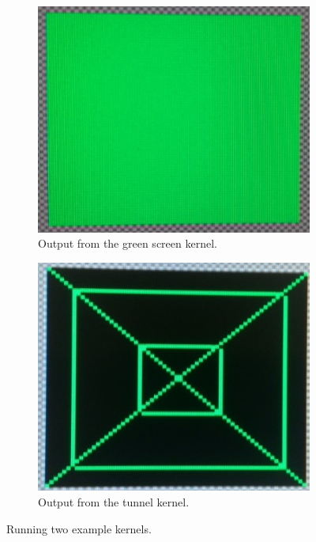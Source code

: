 \documentclass[../main/report.tex]{subfiles}
\begin{document}
\begin{figure}[H]
	\centering
	\begin{subfigure}[t]{0.45\textwidth}
		\centering
		\includegraphics[width=\textwidth]{../results/diagrams/green_screen_run.jpg}
		\caption{Output from the green screen kernel.}
	\end{subfigure} 
	\begin{subfigure}[t]{0.45\textwidth}
		\centering
		\includegraphics[width=\textwidth]{../results/diagrams/kernel_run_tunnel.jpg}
		\caption{Output from the tunnel kernel.}
	\end{subfigure}
	\caption{Running two example kernels.}
	\label{fig:kernel_outputs}
\end{figure}
\end{document}
